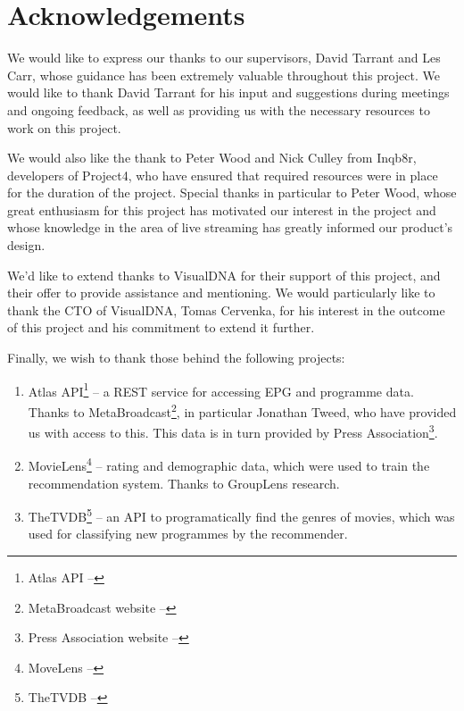 \section{Acknowledgements}

We would like to express our thanks to our supervisors, David Tarrant and Les Carr, whose guidance has been extremely valuable throughout this project. We would like to thank David Tarrant for his input and suggestions during meetings and ongoing feedback, as well as providing us with the necessary resources to work on this project.

We would also like the thank to Peter Wood and Nick Culley from Inqb8r, developers of Project4, who have ensured that required resources were in place for the duration of the project. Special thanks in particular to Peter Wood, whose great enthusiasm for this project has motivated our interest in the project and whose knowledge in the area of live streaming has greatly informed our product's design.

We'd like to extend thanks to VisualDNA for their support of this project, and their offer to provide assistance and mentioning. We would particularly like to thank the CTO of VisualDNA, Tomas Cervenka, for his interest in the outcome of this project and his commitment to extend it further.

Finally, we wish to thank those behind the following projects:
\begin{enumerate}
\item Atlas API\footnote{Atlas API -- } -- a REST service for accessing EPG and programme data. Thanks to MetaBroadcast\footnote{MetaBroadcast website -- }, in particular Jonathan Tweed, who have provided us with access to this. This data is in turn provided by Press Association\footnote{Press Association website -- }.
\item MovieLens\footnote{MoveLens -- } -- rating and demographic data, which were used to train the recommendation system. Thanks to GroupLens research.
\item TheTVDB\footnote{TheTVDB -- } -- an API to programatically find the genres of movies, which was used for classifying new programmes by the recommender.
\end{enumerate}

\cleardoublepage
\setcounter{tocdepth}{2}

\begin{comment}
	\tableofcontents
	\newpage
	\cleardoublepage
	\setcounter{page}{0}
	\pagenumbering{arabic}
	\cleardoublepage
\end{comment}

